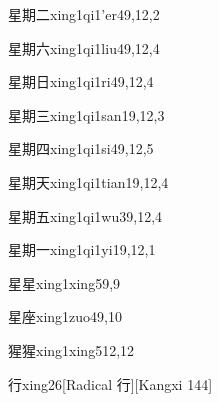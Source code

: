 \begin{entry}{星期二}{xing1qi1'er4}{9,12,2}
\end{entry}

\begin{entry}{星期六}{xing1qi1liu4}{9,12,4}
\end{entry}

\begin{entry}{星期日}{xing1qi1ri4}{9,12,4}
\end{entry}

\begin{entry}{星期三}{xing1qi1san1}{9,12,3}
\end{entry}

\begin{entry}{星期四}{xing1qi1si4}{9,12,5}
\end{entry}

\begin{entry}{星期天}{xing1qi1tian1}{9,12,4}
\end{entry}

\begin{entry}{星期五}{xing1qi1wu3}{9,12,4}
\end{entry}

\begin{entry}{星期一}{xing1qi1yi1}{9,12,1}
\end{entry}

\begin{entry}{星星}{xing1xing5}{9,9}
\end{entry}

\begin{entry}{星座}{xing1zuo4}{9,10}
\end{entry}

\begin{entry}{猩猩}{xing1xing5}{12,12}
\end{entry}

\begin{entry}{行}{xing2}{6}[Radical 行][Kangxi 144]
\end{entry}

